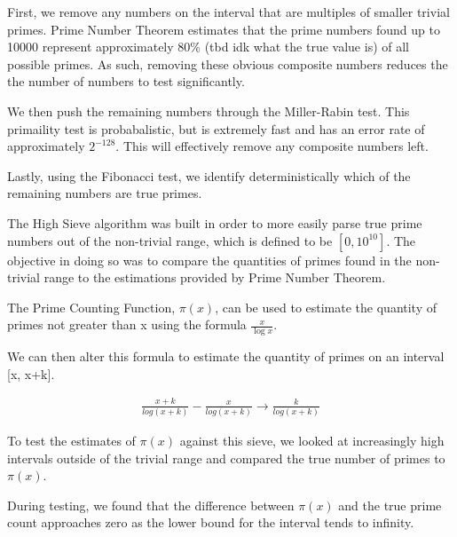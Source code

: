 \documentclass[11pt]{article}
\begin{document}
First, we remove any numbers on the interval that are multiples of smaller trivial primes. Prime Number Theorem estimates that the prime numbers found up to 10000 represent approximately 80\% (tbd idk what the true value is) of all possible primes. As such, removing these obvious composite numbers reduces the the number of numbers to test significantly.

We then push the remaining numbers through the Miller-Rabin test. This primaility test is probabalistic, but is extremely fast and has an error rate of approximately $2^{-128}$. This will effectively remove any composite numbers left.

Lastly, using the Fibonacci test, we identify deterministically which of the remaining numbers are true primes.

The High Sieve algorithm was built in order to more easily parse true prime numbers out of the non-trivial range, which is defined to be $[0, 10^{10}]$. The objective in doing so was to compare the quantities of primes found in the non-trivial range to the estimations provided by Prime Number Theorem.

The Prime Counting Function, $\pi(x)$, can be used to estimate the quantity of primes not greater than x using the formula $\frac{x}{\log{x}}$. 

We can then alter this formula to estimate the quantity of primes on an interval [x, x+k].

\begin{align*}
	\frac{x+k}{log(x+k)} - \frac{x}{log(x+k)}
	\rightarrow \frac{k}{log(x+k)}
\end{align*}

To test the estimates of $\pi(x)$ against this sieve, we looked at increasingly high intervals outside of the trivial range and compared the true number of primes to $\pi(x)$.

During testing, we found that the difference between $\pi(x)$ and the true prime count approaches zero as the lower bound for the interval tends to infinity.
\end{document}
